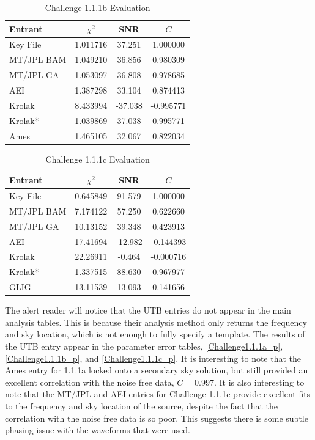 \documentclass[11pt]{article}
\begin{document}
\begin{table}[t]
\caption{\label{Challenge1.1.1b}Challenge 1.1.1b Evaluation}
\begin{center}
\begin{tabular}{|l|c|c|c|}
\hline
Entrant  & $\chi^2$ & SNR & $C$ \\
 \hline
Key File   & 1.011716 & 37.251 & 1.000000 \\
MT/JPL BAM & 1.049210 & 36.856 & 0.980309 \\
MT/JPL GA  & 1.053097 & 36.808 & 0.978685 \\
AEI        & 1.387298 & 33.104 & 0.874413 \\
Krolak     & 8.433994 & -37.038  & -0.995771 \\
Krolak*   & 1.039869 & 37.038  & 0.995771 \\
Ames      & 1.465105 & 32.067 & 0.822034 \\
\hline  
\end{tabular}
\end{center}
\end{table}

\begin{table}[t]
\caption{\label{Challenge1.1.1c}Challenge 1.1.1c Evaluation}
\begin{center}
\begin{tabular}{|l|c|c|c|}
\hline
Entrant  & $\chi^2$ & SNR & $C$ \\
 \hline
Key File   & 0.645849 & 91.579 & 1.000000 \\
MT/JPL BAM & 7.174122 & 57.250 & 0.622660 \\
MT/JPL GA  & 10.13152 & 39.348 & 0.423913 \\
AEI        & 17.41694 & -12.982 & -0.144393 \\
Krolak     & 22.26911 & -0.464 & -0.000716 \\
Krolak*   & 1.337515 & 88.630 & 0.967977 \\
GLIG      & 13.11539 & 13.093 & 0.141656 \\
\hline  
\end{tabular}
\end{center}
\end{table}

The alert reader will notice that the UTB entries do not appear in the main analysis
tables. This is because their analysis method only returns the frequency and sky location,
which is not enough to fully specify a template. The results of the UTB entry appear
in the parameter error tables,  \ref{Challenge1.1.1a_p}, \ref{Challenge1.1.1b_p},
and \ref{Challenge1.1.1c_p}. It is interesting to note that the Ames entry for
1.1.1a locked onto a secondary sky solution, but still provided an excellent
correlation with the noise free data, $C=0.997$. It is also interesting to note
that the MT/JPL and AEI entries for Challenge 1.1.1c provide excellent fits to
the frequency and sky location of the source, despite the fact that the correlation
with the noise free data is so poor. This suggests there is some subtle phasing
issue with the waveforms that were used.
\end{document}
